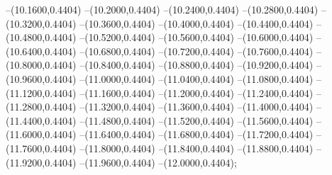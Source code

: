 {	--(10.1600,0.4404)
	--(10.2000,0.4404)
	--(10.2400,0.4404)
	--(10.2800,0.4404)
	--(10.3200,0.4404)
	--(10.3600,0.4404)
	--(10.4000,0.4404)
	--(10.4400,0.4404)
	--(10.4800,0.4404)
	--(10.5200,0.4404)
	--(10.5600,0.4404)
	--(10.6000,0.4404)
	--(10.6400,0.4404)
	--(10.6800,0.4404)
	--(10.7200,0.4404)
	--(10.7600,0.4404)
	--(10.8000,0.4404)
	--(10.8400,0.4404)
	--(10.8800,0.4404)
	--(10.9200,0.4404)
	--(10.9600,0.4404)
	--(11.0000,0.4404)
	--(11.0400,0.4404)
	--(11.0800,0.4404)
	--(11.1200,0.4404)
	--(11.1600,0.4404)
	--(11.2000,0.4404)
	--(11.2400,0.4404)
	--(11.2800,0.4404)
	--(11.3200,0.4404)
	--(11.3600,0.4404)
	--(11.4000,0.4404)
	--(11.4400,0.4404)
	--(11.4800,0.4404)
	--(11.5200,0.4404)
	--(11.5600,0.4404)
	--(11.6000,0.4404)
	--(11.6400,0.4404)
	--(11.6800,0.4404)
	--(11.7200,0.4404)
	--(11.7600,0.4404)
	--(11.8000,0.4404)
	--(11.8400,0.4404)
	--(11.8800,0.4404)
	--(11.9200,0.4404)
	--(11.9600,0.4404)
	--(12.0000,0.4404);
}

